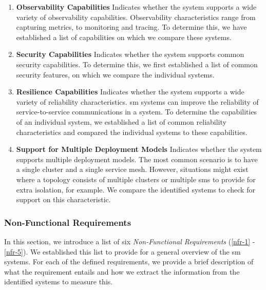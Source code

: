 \begin{enumerate}[label=\textbf{FR\arabic*}, leftmargin=3\parindent]
    \item \textbf{Observability Capabilities}
    \label{fr-1}
    Indicates whether the system supports a wide variety of observability capabilities. Observability characteristics range from capturing metrics, to monitoring and tracing. To determine this, we have established a list of capabilities on which we compare these systems.
    
    \item \textbf{Security Capabilities}
    \label{fr-2}
    Indicates whether the system supports common security capabilities. To determine this, we first established a list of common security features, on which we compare the individual systems.
    
    \item \textbf{Resilience Capabilities}
    \label{fr-3}
    Indicates whether the system supports a wide variety of reliability characteristics. \Gls{sm} systems can improve the reliability of service-to-service communications in a system. To determine the capabilities of an individual system, we established a list of common reliability characteristics and compared the individual systems to these capabilities.
    
    \item \textbf{Support for Multiple Deployment Models}
    \label{fr-4}
    Indicates whether the system supports multiple deployment models. The most common scenario is to have a single cluster and a single service mesh. However, situations might exist where a topology consists of multiple clusters or multiple \glspl{sm} to provide for extra isolation, for example. We compare the identified systems to check for support on this characteristic.
\end{enumerate}


\subsubsection{Non-Functional Requirements}
\label{sec:survey:results:sm-requirements:nfr}

In this section, we introduce a list of six \textit{Non-Functional Requirements} (\ref{nfr-1} - \ref{nfr-5}). We established this list to provide for a general overview of the \gls{sm} systems. For each of the defined requirements, we provide a brief description of what the requirement entails and how we extract the information from the identified systems to measure this.



